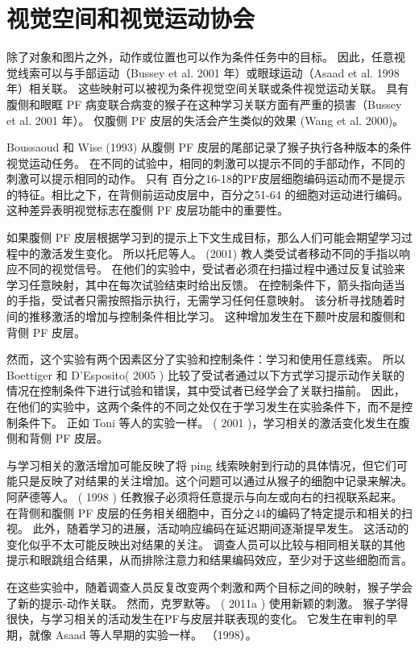 \section{视觉空间和视觉运动协会}
\par
除了对象和图片之外，动作或位置也可以作为条件任务中的目标。 因此，任意视觉线索可以与手部运动（Bussey et al. 2001 年）或眼球运动（Asaad et al. 1998 年）相关联。 这些映射可以被视为条件视觉空间关联或条件视觉运动关联。 具有腹侧和眼眶 PF 病变联合病变的猴子在这种学习关联方面有严重的损害（Bussey et al. 2001 年）。 仅腹侧 PF 皮层的失活会产生类似的效果 (Wang et al. 2000)。
\par
Boussaoud 和 Wise (1993) 从腹侧 PF 皮层的尾部记录了猴子执行各种版本的条件视觉运动任务。 在不同的试验中，相同的刺激可以提示不同的手部动作，不同的刺激可以提示相同的动作。 只有 百分之16-18的PF皮层细胞编码运动而不是提示的特征。相比之下，在背侧前运动皮层中，百分之51-64 的细胞对运动进行编码。 这种差异表明视觉标志在腹侧 PF 皮层功能中的重要性。
\par
如果腹侧 PF 皮层根据学习到的提示上下文生成目标，那么人们可能会期望学习过程中的激活发生变化。 所以托尼等人。 (2001) 教人类受试者移动不同的手指以响应不同的视觉信号。 在他们的实验中，受试者必须在扫描过程中通过反复试验来学习任意映射，其中在每次试验结束时给出反馈。 在控制条件下，箭头指向适当的手指，受试者只需按照指示执行，无需学习任何任意映射。 该分析寻找随着时间的推移激活的增加与控制条件相比学习。 这种增加发生在下颞叶皮层和腹侧和背侧 PF 皮层。
\par
然而，这个实验有两个因素区分了实验和控制条件：学习和使用任意线索。 所以 Boettiger 和 D’Esposito( 2005 ) 比较了受试者通过以下方式学习提示动作关联的情况在控制条件下进行试验和错误，其中受试者已经学会了关联扫描前。 因此，在他们的实验中，这两个条件的不同之处仅在于学习发生在实验条件下，而不是控制条件下。 正如 Toni 等人的实验一样。 ( 2001 )，学习相关的激活变化发生在腹侧和背侧 PF 皮层。
\par
与学习相关的激活增加可能反映了将 ping 线索映射到行动的具体情况，但它们可能只是反映了对结果的关注增加。这个问题可以通过从猴子的细胞中记录来解决。 阿萨德等人。 ( 1998 ) 任教猴子必须将任意提示与向左或向右的扫视联系起来。 在背侧和腹侧 PF 皮层的任务相关细胞中，百分之44的编码了特定提示和相关的扫视。 此外，随着学习的进展，活动响应编码在延迟期间逐渐提早发生。 这活动的变化似乎不太可能反映出对结果的关注。 调查人员可以比较与相同相关联的其他提示和眼跳组合结果，从而排除注意力和结果编码效应，至少对于这些细胞而言。
\par
在这些实验中，随着调查人员反复改变两个刺激和两个目标之间的映射，猴子学会了新的提示-动作关联。 然而，克罗默等。 ( 2011a ) 使用新颖的刺激。 猴子学得很快，与学习相关的活动发生在PF与皮层并联表现的变化。 它发生在审判的早期，就像 Asaad 等人早期的实验一样。 （1998）。
